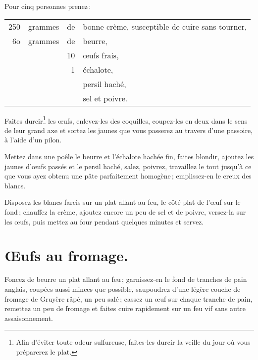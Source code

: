 
Pour cinq personnes prenez :

\medskip

\footnotesize
\begin{longtable}{rrrp{16em}}
  250 & grammes & de & bonne crème, susceptible de cuire sans tourner,                                    \\
   6o & grammes & de & beurre,                                                                            \\
      &         & 10 & œufs frais,                                                                        \\
      &         &  1 & échalote,                                                                          \\
      &         &    & persil haché,                                                                      \\
      &         &    & sel et poivre.                                                                     \\
\end{longtable}
\normalsize

Faites durcir\footnote{Afin d'éviter toute odeur sulfureuse, faites-les durcir
la veille du jour où vous préparerez le plat.} les œufs, enlevez-les des
coquilles, coupez-les en deux dans le sens de leur grand axe et sortez les
jaunes que vous passerez au travers d'une passoire, à l’aide d'un pilon.

Mettez dans une poêle le beurre et l'échalote hachée fin, faites blondir,
ajoutez les jaunes d'œufs passés et le persil haché, salez, poivrez, travaillez
le tout jusqu'à ce que vous ayez obtenu une pâte parfaitement homogène ;
emplissez-en le creux des blancs.

Disposez les blancs farcis sur un plat allant au feu, le côté plat de l'œuf sur le
fond ; chauffez la crème, ajoutez encore un peu de sel et de poivre, versez-la sur
les œufs, puis mettez au four pendant quelques minutes et servez.

\section*{\centering Œufs au fromage.}

Foncez de beurre un plat allant au feu ; garnissez-en le fond de tranches de
pain anglais, coupées aussi minces que possible, saupoudrez d'une légère couche
de fromage de Gruyère râpé, un peu salé ; cassez un œuf sur chaque tranche de
pain, remettez un peu de fromage et faites cuire rapidement sur un feu vif sans
autre assaisonnement.

